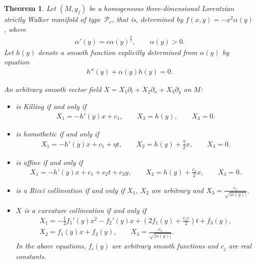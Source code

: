 \documentclass[10pt,a4paper]{amsart}
\numberwithin{equation}{section}
\newtheorem{Theorem}{Theorem}[section]
\begin{document}
\begin{Theorem}\label{Pc}
Let $(M,g_f)$ be a homogeneous three-dimensional Lorentzian strictly Walker mani\-fold of type~$\mathcal P_c$, that is, determined by $f(x,y)=-x^2\alpha(y)$, where \begin{gather*}\alpha '(y)=c\alpha(y)^{\frac32},\qquad \alpha(y)>0.\end{gather*}
Let $h(y)$ denote a smooth function explicitly determined from $\alpha(y)$ by equation
\begin{gather*}h''(y)+\alpha(y)h(y)=0.\end{gather*}

An arbitrary smooth vector field $X=X_1\partial_t+X_2\partial_x+X_3\partial_y$ on $M$:
\begin{itemize}\itemsep=0pt
\item is Killing if and only if
\begin{gather*}X_1=-h'(y) x+c_1,\qquad X_2=h(y),\qquad X_3=0.\end{gather*}
\item is homothetic if and only if
\begin{gather*}X_1=-h'(y)x+c_1+\eta t,\qquad X_2=h(y)+\frac\eta2 x,\qquad X_3=0.\end{gather*}
\item is affine if and only if
\begin{gather*}X_1=-h'(y)x+c_1+c_2t+c_3y,\qquad X_2=h(y)+\frac{c_2}{2}x,\qquad X_3=0.\end{gather*}
\item is a Ricci collineation if and only if $X_1$, $X_2$ are arbitrary and $X_3=\frac{c_1}{\sqrt{|\alpha(y)|}}$.
\item $X$ is a curvature collineation if and only if
\begin{gather*}
X_1=-\frac12f_1 '(y) x^2-f_2 '(y) x+\left(2f_1(y)+\frac{c_1c}{2}\right)t+f_3(y),\\ X_2=f_1(y)x+f_2(y),\qquad X_3=\frac{c_1}{\sqrt{|\alpha(y)|}}.
\end{gather*}
In the above equations, $f_i(y)$ are arbitrary smooth functions and $c_j$ are real constants.
\end{itemize}
\end{Theorem}
\end{document}
